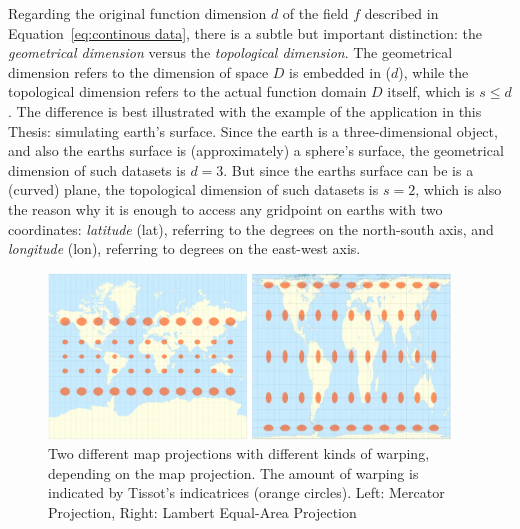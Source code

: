 Regarding the original function dimension $d$ of the field $f$ described in Equation~\ref{eq:continous data}, there is a subtle but important distinction: the \textit{geometrical dimension} versus the \textit{topological dimension}. 
The geometrical dimension refers to the dimension of space $D$ is embedded in ($d$), while the topological dimension refers to the actual function domain $D$ itself, which is $s\leq d$ \cite{telea2014data}.
The difference is best illustrated with the example of the application in this Thesis: simulating earth's surface. 
Since the earth is a three-dimensional object, and also the earths surface is (approximately) a sphere's surface, the geometrical dimension of such datasets is $d=3$. 
But since the earths surface can be is a (curved) plane, the topological dimension of such datasets is $s=2$, which is also the reason why it is enough to access any gridpoint on earths with two coordinates: \textit{latitude} (lat), referring to the degrees on the north-south axis, and \textit{longitude} (lon), referring to degrees on the east-west axis.

\begin{figure}[htp]
  \begin{center}
    \includegraphics[width=0.95\textwidth]{figures/tissot-map-projections.png}
  \end{center}
  \caption{Two different map projections with different kinds of warping, depending on the map projection. The amount of warping is indicated by Tissot’s indicatrices (orange circles). Left: Mercator Projection, Right: Lambert Equal-Area Projection \cite{ghaderpour_map_2014}}\label{fig:tissot map projections}
\end{figure}


